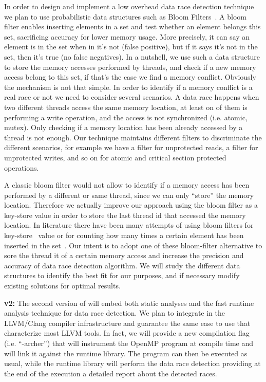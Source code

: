 In order to design and implement a low overhead data race detection technique
we plan to use probabilistic data structures such as Bloom
Filters~\cite{Bloom:1970:STH:362686.362692}.
%
A bloom filter enables inserting elements in a set and test whether an element
belongs this set, sacrificing accuracy for lower memory usage.
%
More precisely, it can say an element is in the set when in it’s not (false
positive), but if it says it’s not in the set, then it’s true (no false
negatives).
%
In a nutshell, we use such a data structure to store the memory accesses
performed by threads, and check if a new memory access belong to this set, if
that's the case we find a memory conflict.
%
Obviously the mechanism is not that simple.
%
In order to identify if a memory conflict is a real race or not we need to
consider several scenarios.
%
A data race happens when two different threads access the same memory
location, at least on of them is performing a write operation, and the access
is not synchronized (i.e. atomic, mutex).
%
Only checking if a memory location has been already accessed by a thread is
not enough.
%
Our technique maintains different filters to discriminate the different
scenarios, for example we have a filter for unprotected reads, a filter for
unprotected writes, and so on for atomic and critical section protected
operations.

A classic bloom filter would not allow to identify if a memory access has been
performed by a different or same thread, since we can only ``store'' the
memory location.
%
Therefore we actually improve our approach using the bloom filter as a
key-store value in order to store the last thread id that accessed the memory
location.
%
In literature there have been many attempts of using bloom filters for
key-store~\cite{6995996} value or for counting how many times a certain
element has been inserted in the set~\cite{Deng:2006:ADD:1142473.1142477}.
%
Our intent is to adopt one of these bloom-filter alternative to sore the
thread it of a certain memory access and increase the precision and accuracy
of data race detection algorithm.
%
We will study the different data structures to identify the best fit for our
purposes, and if necessary modify existing solutions for optimal results.

\textbf{\archer v2:} The second version of \archer will embed both static
analyses and the fast runtime analysis technique for data race detection.
%
We plan to integrate \archer in the LLVM/Clang compiler infrastructure and
guarantee the same ease to use that characterize most LLVM tools.
%
In fact, we will provide a new compilation flag (i.e. ``-archer'') that will
instrument the OpenMP program at compile time and will link it against the
\archer runtime library.
%
The program can then be executed as usual, while the \archer runtime library
will perform the data race detection providing at the end of the execution a
detailed report about the detected races.

